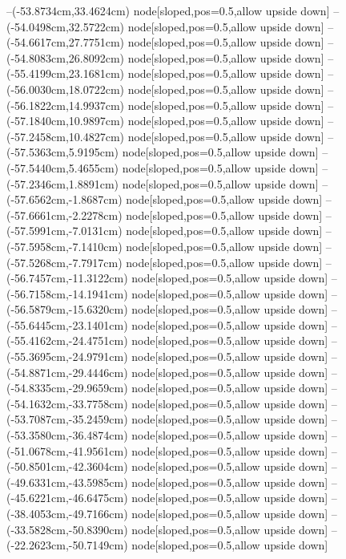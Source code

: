 --(-53.8734cm,33.4624cm) node[sloped,pos=0.5,allow upside down]{\ArrowIn}
--(-54.0498cm,32.5722cm) node[sloped,pos=0.5,allow upside down]{\arrowIn}
--(-54.6617cm,27.7751cm) node[sloped,pos=0.5,allow upside down]{\ArrowIn}
--(-54.8083cm,26.8092cm) node[sloped,pos=0.5,allow upside down]{\arrowIn}
--(-55.4199cm,23.1681cm) node[sloped,pos=0.5,allow upside down]{\ArrowIn}
--(-56.0030cm,18.0722cm) node[sloped,pos=0.5,allow upside down]{\ArrowIn}
--(-56.1822cm,14.9937cm) node[sloped,pos=0.5,allow upside down]{\ArrowIn}
--(-57.1840cm,10.9897cm) node[sloped,pos=0.5,allow upside down]{\ArrowIn}
--(-57.2458cm,10.4827cm) node[sloped,pos=0.5,allow upside down]{\arrowIn}
--(-57.5363cm,5.9195cm) node[sloped,pos=0.5,allow upside down]{\ArrowIn}
--(-57.5440cm,5.4655cm) node[sloped,pos=0.5,allow upside down]{\arrowIn}
--(-57.2346cm,1.8891cm) node[sloped,pos=0.5,allow upside down]{\ArrowIn}
--(-57.6562cm,-1.8687cm) node[sloped,pos=0.5,allow upside down]{\ArrowIn}
--(-57.6661cm,-2.2278cm) node[sloped,pos=0.5,allow upside down]{\arrowIn}
--(-57.5991cm,-7.0131cm) node[sloped,pos=0.5,allow upside down]{\ArrowIn}
--(-57.5958cm,-7.1410cm) node[sloped,pos=0.5,allow upside down]{\arrowIn}
--(-57.5268cm,-7.7917cm) node[sloped,pos=0.5,allow upside down]{\arrowIn}
--(-56.7457cm,-11.3122cm) node[sloped,pos=0.5,allow upside down]{\ArrowIn}
--(-56.7158cm,-14.1941cm) node[sloped,pos=0.5,allow upside down]{\ArrowIn}
--(-56.5879cm,-15.6320cm) node[sloped,pos=0.5,allow upside down]{\ArrowIn}
--(-55.6445cm,-23.1401cm) node[sloped,pos=0.5,allow upside down]{\ArrowIn}
--(-55.4162cm,-24.4751cm) node[sloped,pos=0.5,allow upside down]{\ArrowIn}
--(-55.3695cm,-24.9791cm) node[sloped,pos=0.5,allow upside down]{\arrowIn}
--(-54.8871cm,-29.4446cm) node[sloped,pos=0.5,allow upside down]{\ArrowIn}
--(-54.8335cm,-29.9659cm) node[sloped,pos=0.5,allow upside down]{\arrowIn}
--(-54.1632cm,-33.7758cm) node[sloped,pos=0.5,allow upside down]{\ArrowIn}
--(-53.7087cm,-35.2459cm) node[sloped,pos=0.5,allow upside down]{\ArrowIn}
--(-53.3580cm,-36.4874cm) node[sloped,pos=0.5,allow upside down]{\ArrowIn}
--(-51.0678cm,-41.9561cm) node[sloped,pos=0.5,allow upside down]{\ArrowIn}
--(-50.8501cm,-42.3604cm) node[sloped,pos=0.5,allow upside down]{\arrowIn}
--(-49.6331cm,-43.5985cm) node[sloped,pos=0.5,allow upside down]{\ArrowIn}
--(-45.6221cm,-46.6475cm) node[sloped,pos=0.5,allow upside down]{\ArrowIn}
--(-38.4053cm,-49.7166cm) node[sloped,pos=0.5,allow upside down]{\ArrowIn}
--(-33.5828cm,-50.8390cm) node[sloped,pos=0.5,allow upside down]{\ArrowIn}
--(-22.2623cm,-50.7149cm) node[sloped,pos=0.5,allow upside down]{\ArrowIn}
